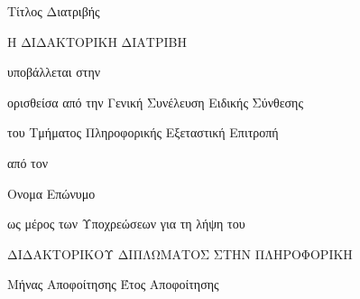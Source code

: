 \newpage
\thispagestyle{empty}
\begin{center}
\vspace*{0.5in} {\LARGE Τίτλος Διατριβής}
\par
\vspace{1in} {\Large Η ΔΙΔΑΚΤΟΡΙΚΗ ΔΙΑΤΡΙΒΗ}

\vspace{0.5in} {\Large υποβάλλεται στην}

\vspace{0.2in} {\Large ορισθείσα από την Γενική Συνέλευση Ειδικής
Σύνθεσης}

\vspace{0.2in} {\Large του Τμήματος Πληροφορικής Εξεταστική
Επιτροπή}

\vspace{0.5in} {\Large από τον }

\vspace{0.7in} {\LARGE Ονομα Επώνυμο}

\vspace{0.5in} {\Large ως μέρος των Υποχρεώσεων για τη λήψη του}

\vspace{0.7in} {\Large ΔΙΔΑΚΤΟΡΙΚΟΥ ΔΙΠΛΩΜΑΤΟΣ ΣΤΗΝ ΠΛΗΡΟΦΟΡΙΚΗ}

\par
\vspace{2.2in} {\Large Μήνας Αποφοίτησης Έτος Αποφοίτησης}
\par\vspace{0.6in}
\end{center}
\thispagestyle{empty}